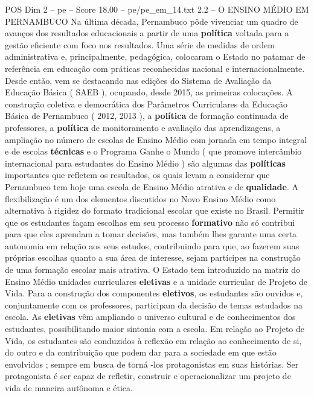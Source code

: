 \begin{textsample}{POS Dim 2 – pe – Score 18.00 – pe/pe\_em\_14.txt}  \label{ex:f2_pos_258}
2.2 – O ENSINO MÉDIO EM PERNAMBUCO Na última década, Pernambuco pôde vivenciar um quadro de avanços dos resultados educacionais a partir de uma \textbf{política} voltada para a gestão eficiente com foco nos resultados.
Uma série de medidas de ordem administrativa e, principalmente, pedagógica, colocaram o Estado no patamar de referência em educação com práticas reconhecidas nacional e internacionalmente.
Desde então, vem se destacando nas edições do Sistema de Avaliação da Educação Básica ( SAEB ), ocupando, desde 2015, as primeiras colocações.
A construção coletiva e democrática dos Parâmetros Curriculares da Educação Básica de Pernambuco ( 2012, 2013 ), a \textbf{política} de formação continuada de professores, a \textbf{política} de monitoramento e avaliação das aprendizagens, a ampliação no número de escolas de Ensino Médio com jornada em tempo integral e de escolas \textbf{técnicas} e o Programa Ganhe o Mundo ( que promove intercâmbio internacional para estudantes do Ensino Médio ) são algumas das \textbf{políticas} importantes que refletem os resultados, os quais levam a considerar que Pernambuco tem hoje uma escola de Ensino Médio atrativa e de \textbf{qualidade}.
A flexibilização é um dos elementos discutidos no Novo Ensino Médio como alternativa à rigidez do formato tradicional escolar que existe no Brasil.
Permitir que os estudantes façam escolhas em seu processo \textbf{formativo} não só contribui para que eles aprendam a tomar decisões, mas também lhes garante uma certa autonomia em relação aos seus estudos, contribuindo para que, ao fazerem suas próprias escolhas quanto a sua área de interesse, sejam partícipes na construção de uma formação escolar mais atrativa.
O Estado tem introduzido na matriz do Ensino Médio unidades curriculares \textbf{eletivas} e a unidade curricular de Projeto de Vida.
Para a construção dos componentes \textbf{eletivos}, os estudantes são ouvidos e, conjuntamente com os professores, participam da decisão de temas estudados na escola.
As \textbf{eletivas} vêm ampliando o universo cultural e de conhecimentos dos estudantes, possibilitando maior sintonia com a escola.
Em relação ao Projeto de Vida, os estudantes são conduzidos à reflexão em relação ao conhecimento de si, do outro e da contribuição que podem dar para a sociedade em que estão envolvidos ; sempre em busca de torná -los protagonistas em suas histórias.
Ser protagonista é ser capaz de refletir, construir e operacionalizar um projeto de vida de maneira autônoma e ética.

\end{textsample}
